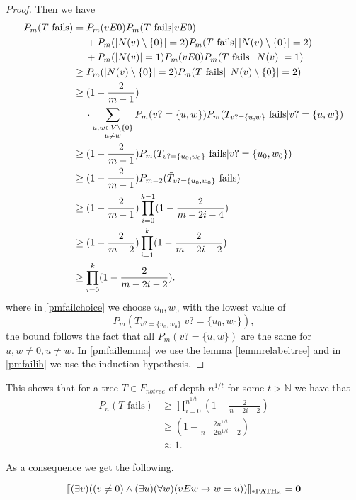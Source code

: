 \begin{proof}
Then we have
\begin{align}
P_m(\text{$T$ fails})&=P_m(vE0)P_m(\text{$T$ fails}|vE0)\\
&\:\phantom{=}\:+P_m(\left|{N(v)\setminus\{0\}}\right|=2)P_m(\text{$T$ fails}|\left|{N(v)\setminus\{0\}}\right|=2)\\
&\:\phantom{=}\:+P_m(\left|{N(v)}\right|=1)P_m(vE0)P_m(\text{$T$ fails}|\left|{N(v)}\right|=1)\\
&\geq P_m(\left|{N(v)\setminus\{0\}}\right|=2)P_m(\text{$T$ fails}|\left|{N(v)\setminus\{0\}}\right|=2)\\
&\geq (1-\frac{2}{m-1})\\
&\:\phantom{=}\:\cdot\sum_{\substack{u,w\in V\setminus \{0\} \\ u\not= w}}P_m(v?=\{u,w\})P_m(T_{v?=\{u,w\}}\text{ fails}|v?=\{u,w\})\\
&\geq(1-\frac{2}{m-1})P_m(T_{v?=\{u_0,w_0\}}\text{ fails}|v?=\{u_0,w_0\})\label{pmfailchoice}\\
&\geq(1-\frac{2}{m-1})P_{m-2}(\tilde T_{v?=\{u_0,w_0\}}\text{ fails})\label{pmfaillemma}\\
&\geq(1-\frac{2}{m-1})\prod_{i=0}^{k-1}(1-\frac{2}{m-2i-4})\label{pmfailih}\\
&\geq(1-\frac{2}{m-2})\prod_{i=1}^{k}(1-\frac{2}{m-2i-2})\\
&\geq\prod_{i=0}^{k}(1-\frac{2}{m-2i-2}).
\end{align}
where in \eqref{pmfailchoice} we choose $u_0,w_0$ with the lowest value of \[P_m(\text{$T_{v?=\{u_0,w_0\}}|v?=\{u_0,w_0\}$}),\] the bound follows the fact that all $P_m(v?=\{u,w\})$ are the same for $u,w\not = 0, u\not=w$. In \eqref{pmfaillemma} we use the lemma \ref{lemmrelabeltree} and in \eqref{pmfailih} we use the induction hypothesis.
\end{proof}

This shows that for a tree $T\in F_{nbtree}$ of depth $n^{1/t}$ for some $t>\mathbb{N}$ we have that
\begin{align}
P_n(\text{$T$ fails})&\geq \prod_{i=0}^{n^{1/t}}\left(1-\frac{2}{n-2i-2}\right)\\
&\geq \left(1-\frac{2n^{1/t}}{n-2n^{1/t}-2}\right)\\
&\approx 1.
\end{align}

As a consequence we get the following.

\begin{thrm}
\[\llbracket(\exists v)((v\not=0)\land(\exists u)(\forall w)(vEw \to w=u))\rrbracket_{*\text{PATH}_n}=\textbf{0}\]
\end{thrm}

